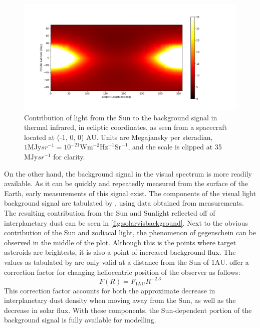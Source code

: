\begin{figure}[htbp]
 \centering
 \includegraphics[width=1.0\textwidth]{img/background_tir_zodiac.png}
 \caption{Contribution of light from the Sun to the background signal in thermal infrared, in ecliptic coordinates, as seen from a spacecraft located at (-1, 0, 0) AU. Units are Megajansky per steradian, $1 \mathrm{MJy}{sr}^{-1} = 10^{-21} \mathrm{W}\mathrm{m}^{-2}\mathrm{Hz}^{-1}\mathrm{Sr}^{-1}$, and the scale is clipped at 35 $\mathrm{MJy}{sr}^{-1}$ for clarity.}
 \label{fig:solartirbackground}
\end{figure}

On the other hand, the background signal in the visual spectrum is more readily available. As it can be quickly and repeatedly measured from the surface of the Earth, early measurements of this signal exist. The components of the visual light background signal are tabulated by \cite{LightOfTheNightSky}, using data obtained from measurements. The resulting contribution from the Sun and Sunlight reflected off of interplanetary dust can be seen in \autoref{fig:solarvisbackground}. Next to the obvious contribution of the Sun and zodiacal light, the phenomenon of gegenschein can be observed in the middle of the plot. Although this is the points where target asteroids are brightests, it is also a point of increased background flux. The values as tabulated by \cite{LightOfTheNightSky} are only valid at a distance from the Sun of $1 \mathrm{AU}$. \cite{SkyBrightness} offer a correction factor for changing heliocentric position of the observer as follows:
\begin{equation}
 F(R) = F_{1\mathrm{AU}}R^{-2.3}
\end{equation}
This correction factor accounts for both the approximate decrease in interplanetary dust density when moving away from the Sun, as well as the decrease in solar flux. With these components, the Sun-dependent portion of the background signal is fully available for modelling. \\


